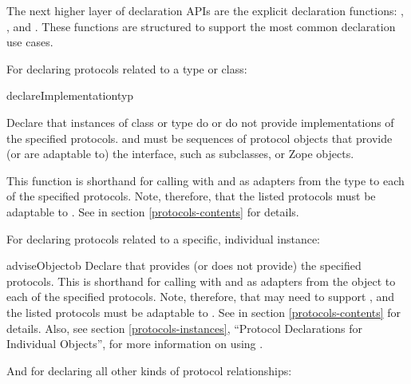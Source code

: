 \begin{verbatim%
}
\begin{verbatim%
}
\begin{verbatim%
}
\begin{verbatim%
}
\begin{verbatim%
}
\begin{verbatim%
}
The next higher layer of declaration APIs are the explicit declaration
functions: , , and
.  These functions are structured to support the most
common declaration use cases.

For declaring protocols related to a type or class:

\begin{funcdesc}{declareImplementation}{typ
 }

Declare that instances of class or type  do or do not provide
implementations of the specified protocols.   and
 must be sequences of protocol objects that
provide (or are adaptable to) the  interface,
such as  subclasses, or Zope 
objects.

This function is shorthand for calling 
with  and  as adapters
from the type to each of the specified protocols.  Note, therefore, that the
listed protocols must be adaptable to .  See
 in section \ref{protocols-contents} for
details.
\end{funcdesc}


For declaring protocols related to a specific, individual instance:

\begin{funcdesc}{adviseObject}{ob
 }
Declare that  provides (or does not provide) the specified protocols.
This is shorthand for calling 
with  and  as adapters
from the object to each of the specified protocols.  Note, therefore, that
 may need to support , and the listed protocols
must be adaptable to .  See
 in section \ref{protocols-contents} for
details.  Also, see section \ref{protocols-instances}, ``Protocol Declarations
for Individual Objects'', for more information on using
.
\end{funcdesc}





And for declaring all other kinds of protocol relationships:


\end{verbatim%
}
\end{verbatim%
}
\end{verbatim%
}
\end{verbatim%
}
\end{verbatim%
}
\end{verbatim%
}
